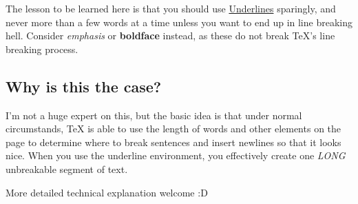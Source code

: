 \documentclass[11pt]{article}
\begin{document}
The lesson to be learned here is that you should use \underline{Underlines} sparingly, and never more than a few words at a time unless you want to end up in line breaking hell. Consider \emph{emphasis} or \textbf{boldface} instead, as these do not break TeX's line breaking process.

\subsection{Why is this the case?}

I'm not a huge expert on this, but the basic idea is that under normal circumstands, TeX is able to use the length of words and other elements on the page to determine where to break sentences and insert newlines so that it looks nice.  When you use the underline environment, you effectively create one \emph{LONG} unbreakable segment of text.

More detailed technical explanation welcome :D
\end{document}
